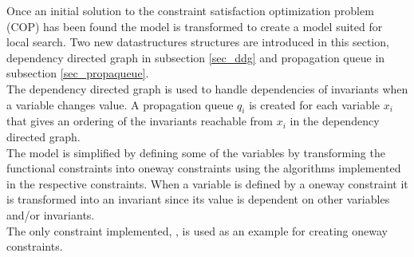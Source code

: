 Once an initial solution to the constraint satisfaction optimization problem (COP) has been found the model 
is transformed to create a model suited for local search. Two new datastructures structures are introduced 
in this section, dependency directed graph in subsection \ref{sec_ddg} and propagation queue in subsection 
\ref{sec_propaqueue}. 
\\
The dependency directed graph is used to handle dependencies of invariants when a 
variable changes value. A propagation queue $q_i$ is created for each variable $x_i$ that gives an ordering of the 
invariants reachable from  $x_i$ in the dependency directed graph. \\
The model is simplified by defining some of the variables by transforming the functional constraints into oneway 
constraints using the algorithms implemented in the respective constraints. When a variable is defined by a oneway 
constraint it is transformed into an invariant since its value is dependent on other variables and/or invariants. \\ 
The only constraint implemented, , is used as an example for creating oneway constraints. 
 